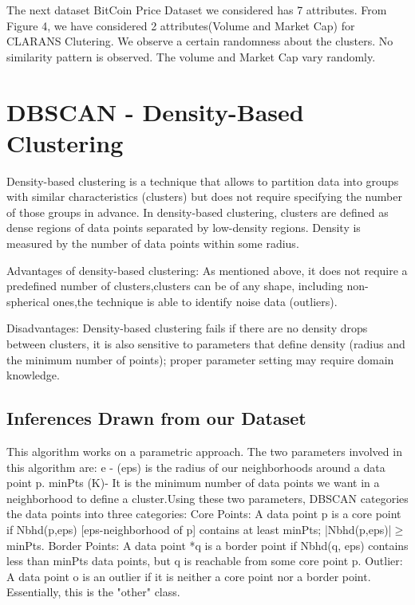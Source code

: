 \documentclass{article}
\begin{document}
The next dataset BitCoin Price Dataset we considered has 7 attributes. From Figure 4, we have considered 2 attributes(Volume and Market Cap) for CLARANS Clutering. We observe a certain randomness about the clusters. No similarity pattern is observed. The volume and Market Cap vary randomly.

\section{DBSCAN - Density-Based Clustering}
Density-based clustering is a technique that allows to partition data into groups with similar characteristics (clusters) but does not require specifying the number of those groups in advance. In density-based clustering, clusters are defined as dense regions of data points separated by low-density regions. Density is measured by the number of data points within some radius.\newline

Advantages of density-based clustering:
As mentioned above, it does not require a predefined number of clusters,clusters can be of any shape, including non-spherical ones,the technique is able to identify noise data (outliers).\newline

Disadvantages:\newline
Density-based clustering fails if there are no density drops between clusters, it is also sensitive to parameters that define density (radius and the minimum number of points); proper parameter setting may require domain knowledge.

\subsection{Inferences Drawn from our Dataset}
This algorithm works on a parametric approach. The two parameters involved in this algorithm are:
e - (eps) is the radius of our neighborhoods around a data point p.
minPts (K)- It is the minimum number of data points we want in a neighborhood to define a cluster.Using these two parameters, DBSCAN categories the data points into three categories:
Core Points: A data point p is a core point if Nbhd(p,eps) [eps-neighborhood of p] contains at least minPts; \mathopen|Nbhd(p,eps)|$\geq$ minPts.
Border Points: A data point *q is a border point if Nbhd(q, eps) contains less than minPts data points, but q is reachable from some core point p.
Outlier: A data point o is an outlier if it is neither a core point nor a border point. Essentially, this is the "other" class. \newline
\end{document}
